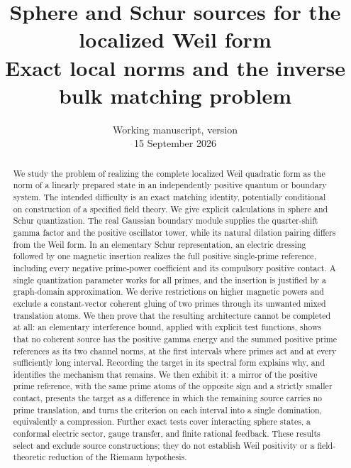 \documentclass[11pt]{article}
\title{Sphere and Schur sources for the localized Weil form\\[5pt]
\large Exact local norms and the inverse bulk matching problem}
\author{}
\date{Working manuscript, version \draftversion\\15 September 2026}
\numberwithin{equation}{section}
\theoremstyle{definition}
\theoremstyle{remark}
\begin{document}
\maketitle
\begin{abstract}
We study the problem of realizing the complete localized Weil quadratic
form as the norm of a linearly prepared state in an independently positive
quantum or boundary system. The intended difficulty is an exact matching
identity, potentially conditional on construction of a specified field
theory. We give explicit calculations in sphere and Schur quantization.
The real Gaussian boundary module supplies the quarter-shift gamma factor
and the positive oscillator tower, while its natural dilation pairing
differs from the Weil form. In an elementary Schur representation, an
electric dressing followed by one magnetic insertion realizes the full
positive single-prime reference, including every negative prime-power
coefficient and its compulsory positive contact. A single quantization
parameter works for all primes, and the insertion is justified by a
graph-domain approximation. We derive restrictions on higher magnetic
powers and exclude a constant-vector coherent gluing of two primes through
its unwanted mixed translation atoms. We then prove that the resulting
architecture cannot be completed at all: an elementary interference bound,
applied with explicit test functions, shows that no coherent source has the
positive gamma energy and the summed positive prime references as its two
channel norms, at the first intervals where primes act and at every
sufficiently long interval. Recording the target in its spectral form
explains why, and identifies the mechanism that remains. We then exhibit it:
a mirror of the positive prime reference, with the same prime atoms of the
opposite sign and a strictly smaller contact, presents the target as a
difference in which the remaining source carries no prime translation, and
turns the criterion on each interval into a single domination, equivalently a
compression. Further exact tests
cover interacting sphere states, a conformal electric sector, gauge transfer,
and finite rational feedback. These results select and exclude source
constructions; they do not establish Weil positivity or a field-theoretic
reduction of the Riemann hypothesis.
\end{abstract}

\clearpage
{\small\tableofcontents}
\clearpage







\appendix




\clearpage
{}
{}

\end{document}

